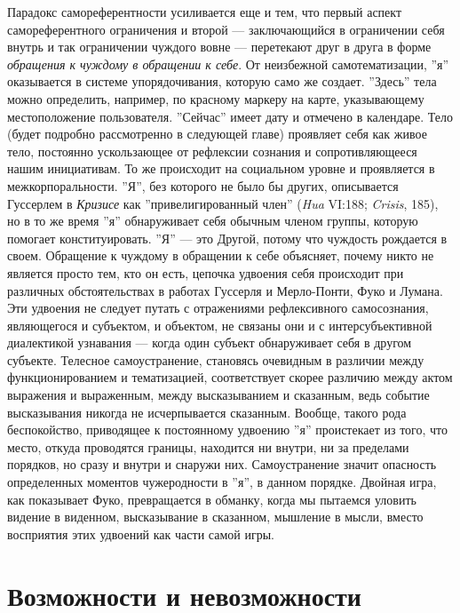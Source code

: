 \documentclass[12pt]{book}
\begin{document}
Парадокс самореферентности усиливается еще и тем, что первый аспект самореферентного ограничения и второй --- заключающийся в ограничении себя внутрь и так ограничении чуждого вовне --- перетекают друг в друга в форме \textit{обращения к чуждому в обращении к себе}. От неизбежной самотематизации, ''я'' оказывается в системе упорядочивания, которую само же создает. ''Здесь'' тела можно определить, например, по красному маркеру на карте, указывающему местоположение пользователя. ''Сейчас'' имеет дату и отмечено в календаре. Тело (будет подробно рассмотренно в следующей главе) проявляет себя как живое тело, постоянно ускользающее от рефлексии сознания и сопротивляющееся нашим инициативам. То же происходит на социальном уровне и проявляется в межкорпоральности. ''Я'', без которого не было бы других, описывается Гуссерлем в \textit{Кризисе} как ''привелигированный член'' (\textit{Hua} VI:188; \textit{Crisis}, 185), но в то же время ''я'' обнаруживает себя обычным членом группы, которую помогает конституировать. ''Я'' --- это Другой, потому что чуждость рождается в своем. Обращение к чуждому в обращении к себе объясняет, почему никто не является просто тем, кто он есть, цепочка удвоения себя происходит при различных обстоятельствах в работах Гуссерля и Мерло-Понти, Фуко и Лумана. Эти удвоения не следует путать с отражениями рефлексивного самосознания, являющегося и субъектом, и объектом, не связаны они и с интерсубъективной диалектикой узнавания --- когда один субъект обнаруживает себя в другом субъекте. Телесное самоустранение, становясь очевидным в различии между функционированием и тематизацией, соответствует скорее различию между актом выражения и выраженным, между высказыванием и сказанным, ведь событие высказывания никогда не исчерпывается сказанным. Вообще, такого рода беспокойство, приводящее к постоянному удвоению ''я'' проистекает из того, что место, откуда проводятся границы, находится ни внутри, ни за пределами порядков, но сразу и внутри и снаружи них. Самоустранение значит опасность определенных моментов чужеродности в ''я'', в данном порядке. Двойная игра, как показывает Фуко, превращается в обманку, когда мы пытаемся уловить видение в виденном, высказывание в сказанном, мышление в мысли, вместо восприятия этих удвоений как части самой игры.

\section{Возможности и невозможности}
\end{document}
